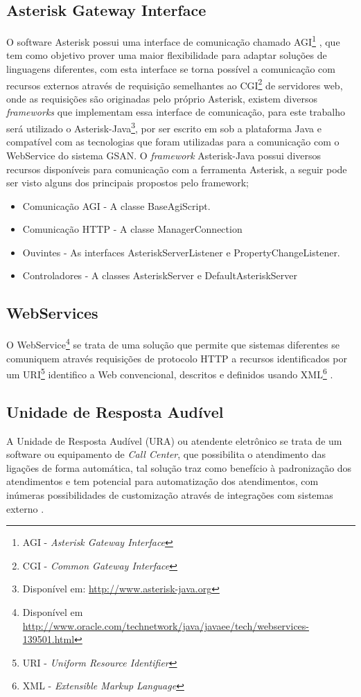 \subsection{Asterisk Gateway Interface}
O software Asterisk possui uma interface de comunicação chamado AGI\footnote{AGI - \textit{Asterisk Gateway Interface}} \cite{asteriskAgi}, que tem como objetivo prover uma maior flexibilidade para adaptar soluções de linguagens diferentes, com esta interface se torna possível a comunicação com recursos externos através de requisição semelhantes ao CGI\footnote{CGI - \textit{Common Gateway Interface}} de servidores web, onde as requisições são originadas pelo próprio Asterisk, existem diversos \textit{frameworks} que implementam essa interface de comunicação, para este trabalho será utilizado o Asterisk-Java\footnote{Disponível em: \url{http://www.asterisk-java.org}}\label{key:asteriskjava}, por ser escrito em sob a plataforma Java e compatível com as tecnologias que foram utilizadas para a comunicação com o WebService do sistema GSAN.
O \textit{framework} Asterisk-Java possui diversos recursos disponíveis para comunicação com a ferramenta Asterisk, a seguir pode ser visto alguns dos principais propostos pelo framework;

\begin{itemize}
	\item Comunicação AGI - A classe BaseAgiScript.
	\item Comunicação HTTP - A classe ManagerConnection
	\item Ouvintes - As interfaces AsteriskServerListener e PropertyChangeListener.
	\item Controladores - A classes AsteriskServer e DefaultAsteriskServer
\end{itemize}


\subsection{WebServices}
O WebService\footnote{Disponível em \url{http://www.oracle.com/technetwork/java/javaee/tech/webservices-139501.html}} se trata de uma solução que permite que sistemas diferentes se comuniquem através requisições de protocolo HTTP a recursos identificados por um URI\footnote{URI - \textit{Uniform Resource Identifier}}  identifico a Web convencional, descritos e definidos usando XML\footnote{XML - \textit{Extensible Markup Language}} .

\subsection{Unidade de Resposta Audível}
A Unidade de Resposta Audível\label{key:URA} (URA) ou atendente eletrônico se trata de um software ou equipamento de \textit{Call Center}, que possibilita o atendimento das ligações de forma automática, tal solução traz como benefício à padronização dos atendimentos e tem potencial para automatização dos atendimentos, com inúmeras possibilidades de customização através de integrações com sistemas externo \cite{VIEIRA:2007}.


